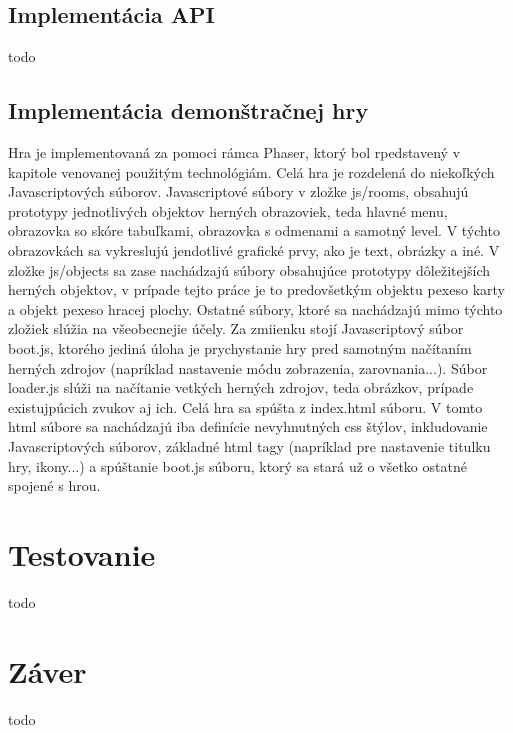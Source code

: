 \section{Implementácia API}
todo

\section{Implementácia demonštračnej hry}
Hra je implementovaná za pomoci rámca Phaser, ktorý bol rpedstavený v kapitole venovanej použitým technológiám. Celá hra je rozdelená do niekoľkých Javascriptových súborov. Javascriptové súbory v zložke js/rooms, obsahujú prototypy jednotlivých objektov herných obrazoviek, teda hlavné menu, obrazovka so skóre tabuľkami, obrazovka s odmenami a samotný level.  V týchto obrazovkách sa vykreslujú jendotlivé grafické prvy, ako je text, obrázky a iné. V zložke  js/objects sa zase nachádzajú súbory obsahujúce prototypy dôležitejších herných objektov, v prípade tejto práce je to predovšetkým objektu pexeso karty a objekt pexeso hracej plochy. Ostatné súbory, ktoré sa nachádzajú mimo týchto zložiek slúžia na všeobecnejie účely. Za zmiienku stojí Javascriptový súbor boot.js, ktorého jediná úloha je prychystanie hry pred samotným načítaním herných zdrojov (napríklad nastavenie módu zobrazenia, zarovnania...). Súbor loader.js slúži na načítanie vetkých herných zdrojov, teda obrázkov, prípade existujpúcich zvukov aj ich. Celá hra sa spúšta z index.html súboru. V tomto html súbore sa nachádzajú iba definície nevyhnutných css štýlov, inkludovanie Javascriptových súborov, základné html tagy (napríklad pre nastavenie titulku hry, ikony...) a spúštanie boot.js súboru, ktorý sa stará už o všetko ostatné spojené s hrou.

\chapter{Testovanie}
\label{chap:testovanie}
todo

\chapter{Záver}
\label{chap:zaver}
todo












